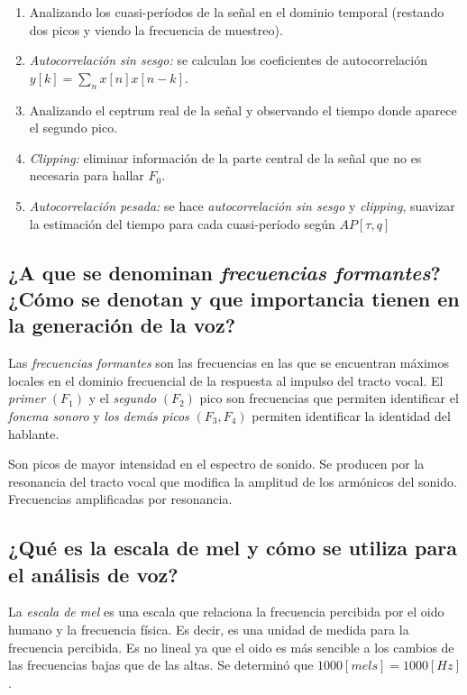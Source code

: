\documentclass[a4paper,10pt,spanish,oneside]{article}
\begin{document}
\begin{enumerate}[1.]
\item Analizando los cuasi-períodos de la señal en el dominio temporal (restando dos picos y viendo la frecuencia de muestreo).

\item \textit{Autocorrelación sin sesgo:} se calculan los coeficientes de autocorrelación $\displaystyle y[k]=\sum_{n}x[n]x[n-k]$.

\item Analizando el ceptrum real de la señal y observando el tiempo donde aparece el segundo pico.

\item \textit{Clipping:} eliminar información de la parte central de la señal que no es necesaria para hallar $F_{0}$.

\item \textit{Autocorrelación pesada:} se hace \textit{autocorrelación sin sesgo} y \textit{clipping}, suavizar la estimación del tiempo para cada cuasi-período según $AP[\tau,q]$
\end{enumerate}

\subsection{¿A que se denominan \textit{frecuencias formantes}? ¿Cómo se denotan y que importancia tienen en la generación de la voz?}

Las \textit{frecuencias formantes} son las frecuencias en las que se encuentran máximos locales en el dominio frecuencial de la respuesta al impulso del tracto vocal. El \textit{primer} $(F_{1})$ y el \textit{segundo} $(F_{2})$ pico son frecuencias que permiten identificar el \textit{fonema sonoro} y \textit{los demás picos} $(F_{3},F_{4})$ permiten identificar la identidad del hablante.

Son picos de mayor intensidad en el espectro de sonido. Se producen por la resonancia del tracto vocal que modifica la amplitud de los armónicos del sonido. Frecuencias amplificadas por resonancia.

\subsection{¿Qué es la escala de mel y cómo se utiliza para el análisis de voz?}

La \textit{escala de mel} es una escala que relaciona la frecuencia percibida por el oido humano y la frecuencia física. Es decir, es una unidad de medida para la frecuencia percibida. Es no lineal ya que el oido es más sencible a los cambios de las frecuencias bajas que de las altas. Se determinó que $1000[mels]=1000[Hz]$.
\end{document}
